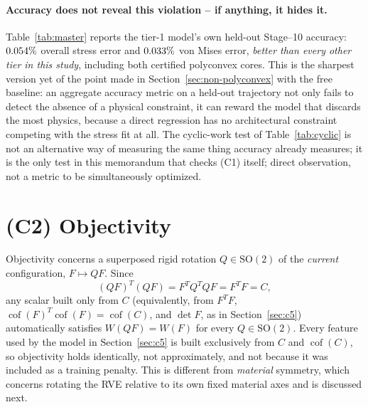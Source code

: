 \documentclass[10pt,a4paper]{article}
\newcommand{\Cof}{\operatorname{cof}}
\newcommand{\SO}{\mathrm{SO}(2)}
\begin{document}
\paragraph{Accuracy does not reveal this violation -- if anything, it hides
it.} Table~\ref{tab:master} reports the tier-1 model's own held-out
Stage--10 accuracy: $0.054\%{}$ overall stress error and
$0.033\%{}$ von Mises error, \emph{better than every other
tier in this study}, including both certified polyconvex cores. This is
the sharpest version yet of the point made in Section~\ref{sec:non-polyconvex}
with the free baseline: an aggregate accuracy metric on a held-out
trajectory not only fails to detect the absence of a physical constraint,
it can reward the model that discards the most physics, because a direct
regression has no architectural constraint competing with the stress fit
at all. The cyclic-work test of Table~\ref{tab:cyclic} is not an
alternative way of measuring the same thing accuracy already measures; it
is the only test in this memorandum that checks (C1) itself; direct
observation, not a metric to be simultaneously optimized.

\section{(C2) Objectivity}
\label{sec:c2}
Objectivity concerns a superposed rigid rotation $Q\in\SO$ of the
\emph{current} configuration, $F\mapsto QF$.  Since
\begin{equation}
 (QF)^T(QF)=F^TQ^TQF=F^TF=C,
\end{equation}
any scalar built only from $C$ (equivalently, from $F^TF$, $\Cof(F)^T\Cof(F)=\Cof(C)$,
and $\det F$, as in Section~\ref{sec:c5}) automatically satisfies
$W(QF)=W(F)$ for every $Q\in\SO$.  Every feature used by the model in
Section~\ref{sec:c5} is built exclusively from $C$ and $\Cof(C)$, so
objectivity holds identically, not approximately, and not because it was
included as a training penalty.  This is different from \emph{material}
symmetry, which concerns rotating the RVE relative to its own fixed
material axes and is discussed next.
\end{document}
